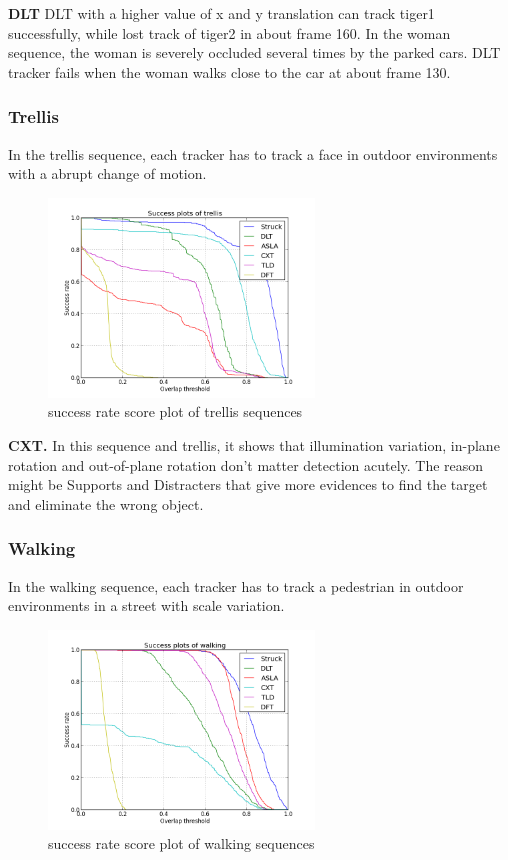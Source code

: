 \documentclass{acm_proc_article-sp}
\begin{document}
\textbf{DLT} DLT with a higher value of x and y translation can track tiger1 successfully, while lost track of tiger2 in about frame 160. In the woman sequence, the woman is severely occluded several times by the parked cars. DLT tracker fails when the woman walks close to the car at about frame 130.

\subsubsection{Trellis}

In the trellis sequence, each tracker has to track a face in outdoor environments with a abrupt change of motion.

\begin{figure}[hbt]
	\centering
    \includegraphics[width=200pt]{trellis}
    \caption{success rate score plot of trellis sequences}
    \label{fig:trellis}
\end{figure}

\textbf{CXT.} In this sequence and trellis, it shows that illumination variation, in-plane rotation and out-of-plane rotation don't matter detection acutely. The reason might be Supports and Distracters that give more evidences to find the target and eliminate the wrong object.

\subsubsection{Walking}

In the walking sequence, each tracker has to track a pedestrian in outdoor environments in a street with scale variation.

\begin{figure}[hbt]
	\centering
    \includegraphics[width=200pt]{walking}
    \caption{success rate score plot of walking sequences}
    \label{fig:walking}
\end{figure}
\end{document}
